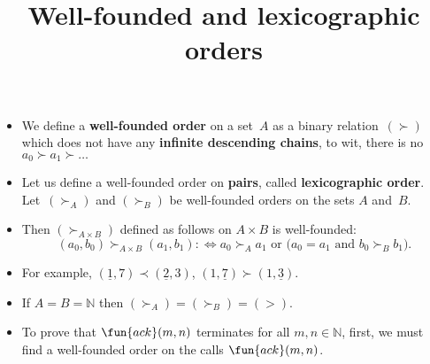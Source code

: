 \documentclass[wide]{slides}
\begin{document}
\begin{slide}
  \title{Well\hyp{}founded and lexicographic orders}

  \begin{itemize}

    \item We define a \textbf{well\hyp{}founded order} on a set~\(A\)
      as a binary relation~\((\succ)\) which does not have any
      \textbf{infinite descending chains}, to wit, there is no \(a_0
      \succ a_1 \succ \dots\)

    \item Let us define a well\hyp{}founded order on \textbf{pairs},
      called \textbf{lexicographic order}. Let~\((\succ_A)\) and
      \((\succ_B)\) be well\hyp{}founded orders on the sets \(A\)
      and~\(B\).

    \item Then \((\succ_{A \times B})\) defined as follows on \(A
      \times B\) is well\hyp{}founded:
      \begin{equation*}
        (a_0,b_0) \succ_{A \times B} (a_1,b_1) :\Leftrightarrow
        \text{\(a_0 \succ_A a_1\) or (\(a_0 = a_1\) and \(b_0 \succ_B
          b_1\)).}
      \end{equation*}

    \item For example, \((\underline{1},7) \prec (\underline{2},3)\),
      \((1,\underline{7}) \succ (1,\underline{3})\).

    \item If \(A=B=\mathbb{N}\) then \((\succ_A) = (\succ_B) =
      (>)\).

    \item To prove that \(\fun{ack}(m,n)\) terminates for all \(m,n
      \in \mathbb{N}\), first, we must find a well\hyp{}founded order
      on the calls \(\fun{ack}(m,n)\).

  \end{itemize}

\end{slide}
\end{document}
